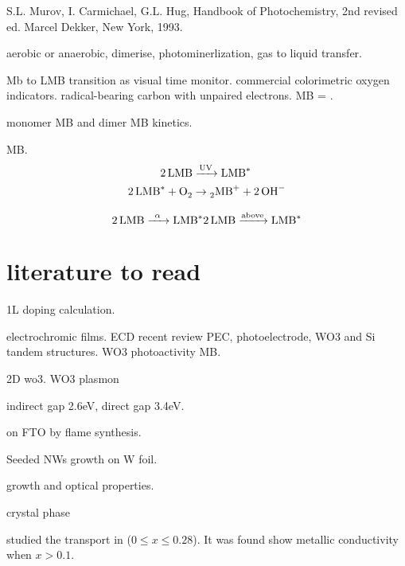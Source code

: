 

S.L. Murov, I. Carmichael, G.L. Hug, Handbook of Photochemistry, 2nd revised ed. Marcel Dekker, New York, 1993.

aerobic or anaerobic, dimerise, photominerlization, gas to liquid transfer.

Mb to LMB transition as visual time monitor. commercial colorimetric oxygen indicators. radical-bearing carbon with unpaired electrons. MB = .\cite{Galagan2008}

monomer MB and dimer MB kinetics.\cite{Spencer1979}



MB. \cite{Lee2003a}
\begin{align}
\cee{ 2LMB &->[\text{UV}] LMB^*\\
2LMB^* + O2 &\rightarrow 2MB^+ + 2OH^-}
\end{align}

\[
\cee{2LMB ->[\alpha] LMB^*}
\cee{2LMB ->[\text{above}] LMB^*}
\]


\section{literature to read}

 1L doping calculation. \cite{Ma2011}

electrochromic films. \cite{Yoshimura1985}
ECD \cite{Jiao2012} recent review \cite{Mortimer2011}
PEC, photoelectrode, WO3 and Si tandem structures.\cite{Coridan2013}
WO3 photoactivity MB. \cite{Watcharenwong2008}

2D wo3.\cite{Kalantar-zadeh2010a} 
WO3 plasmon \cite{Manthiram2012}

 indirect gap 2.6eV, direct gap 3.4eV. \cite{Koffyberg1979}

 on FTO by flame synthesis.\cite{Rao2014} \cite{Xu2006}

Seeded  NWs growth on W foil.\cite{Hong2006a}

 growth and optical properties. \cite{Oishi2001} \cite{Itoh2001}

 crystal phase \cite{Viswanathan1974}

\citeauthor{Salje1984} studied the transport in  ($0\leq x \leq 0.28$).\cite{Salje1984} It was found  show metallic conductivity when $x > 0.1$.

